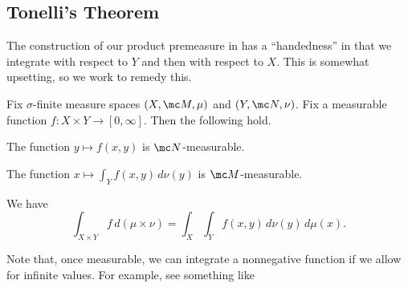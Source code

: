 \documentclass[../notes.tex]{subfiles}
\begin{document}
\subsection{Tonelli's Theorem}
The construction of our product premeasure in  has a ``handedness'' in that we integrate with respect to $Y$ and then with respect to $X$. This is somewhat upsetting, so we work to remedy this.
\begin{theorem}[Tonelli] \label{thm:tonelli}
	Fix $\sigma$-finite measure spaces $(X,\mc M,\mu)$ and $(Y,\mc N,\nu)$. Fix a measurable function $f\colon X\times Y\to[0,\infty]$. Then the following hold.
	\begin{listalph}
		\item The function $y\mapsto f(x,y)$ is $\mc N$-measurable.
		\item The function $x\mapsto\int_Yf(x,y)\,d\nu(y)$ is $\mc M$-measurable.
		\item We have
		\[\int_{X\times Y}f\,d(\mu\times\nu)=\int_X\int_Yf(x,y)\,d\nu(y)\,d\mu(x).\]
	\end{listalph}
\end{theorem}
\begin{remark}
	Note that, once measurable, we can integrate a nonnegative function if we allow for infinite values. For example, see something like \cite[Proposition~9.22]{elber-top}
\end{remark}
\end{document}

